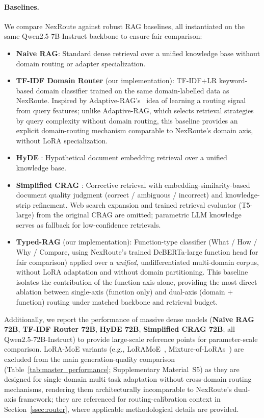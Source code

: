 \documentclass[a4paper,fleql,doubleblind]{cas-sc}
\begin{document}
\paragraph{Baselines.}
We compare NexRoute against robust RAG baselines, all instantiated on the same
Qwen2.5-7B-Instruct backbone to ensure fair comparison:
\begin{itemize}
    \item \textbf{Naive RAG}: Standard dense retrieval over a unified knowledge
    base without domain routing or adapter specialization.

    \item \textbf{TF-IDF Domain Router} (our implementation): TF-IDF$+$LR
    keyword-based domain classifier trained on the same domain-labelled data as
    NexRoute. Inspired by Adaptive-RAG's~\citep{jeong2024adaptiverag} idea of
    learning a routing signal from query features; unlike Adaptive-RAG, which
    selects retrieval strategies by query complexity without domain routing,
    this baseline provides an explicit domain-routing mechanism comparable to
    NexRoute's domain axis, without LoRA specialization.

    \item \textbf{HyDE} \citep{gao2023hyde}: Hypothetical document embedding
    retrieval over a unified knowledge base.

    \item \textbf{Simplified CRAG} \citep{yan2024crag}: Corrective retrieval
    with embedding-similarity-based document quality judgment
    (correct / ambiguous / incorrect) and knowledge-strip refinement. Web
    search expansion and trained retrieval evaluator (T5-large) from the
    original CRAG are omitted; parametric LLM knowledge serves as fallback
    for low-confidence retrievals.

    \item \textbf{Typed-RAG} \citep{typedrag} (our implementation): Function-type
    classifier (What / How / Why / Compare, using NexRoute's trained DeBERTa-large
    function head for fair comparison) applied over a \emph{unified}, undifferentiated
    multi-domain corpus, without LoRA adaptation and without domain partitioning.
    This baseline isolates the contribution of the function axis alone, providing
    the most direct ablation between single-axis (function only) and dual-axis
    (domain + function) routing under matched backbone and retrieval budget.
\end{itemize}
Additionally, we report the performance of massive dense models
(\textbf{Naive RAG 72B}, \textbf{TF-IDF Router 72B}, \textbf{HyDE 72B},
\textbf{Simplified CRAG 72B}; all Qwen2.5-72B-Instruct) to provide large-scale
reference points for parameter-scale comparison. LoRA-MoE variants
(e.g., LoRAMoE~\citep{dou2024loramoe}, Mixture-of-LoRAs~\citep{wu2024mixtureofloras})
are excluded from the main generation-quality comparison
(Table~\ref{tab:master_performance}; Supplementary Material~S5) as they are
designed for single-domain multi-task adaptation without cross-domain routing
mechanisms, rendering them architecturally incomparable to NexRoute's dual-axis
framework; they are referenced for routing-calibration context in
Section~\ref{ssec:router}, where applicable methodological details are provided.
\end{document}
